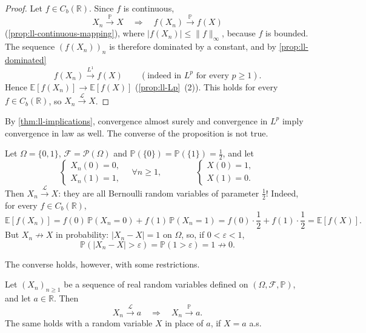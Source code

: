 \begin{proof}
Let $f\in C_b(\mathbb R)$. Since $f$ is continuous,
\[
  X_n\xrightarrow{\mathbb P}X\quad\Longrightarrow\quad f(X_n)\xrightarrow{\mathbb P}f(X)
\]
(\cref{prop:ll-continuous-mapping}), where $|f(X_n)|\le\|f\|_\infty$, because $f$ is bounded.
The sequence $(f(X_n))_n$ is therefore dominated by a constant, and by
\cref{prop:ll-dominated}
\[
  f(X_n)\xrightarrow{L^1}f(X)\qquad(\text{indeed in }L^p\text{ for every }p\ge1).
\]
Hence $\mathbb E[f(X_n)]\to\mathbb E[f(X)]$ (\cref{prop:ll-Lp}~(2)). This holds for every
$f\in C_b(\mathbb R)$, so $X_n\xrightarrow{\mathcal L}X$.
\end{proof}

By \cref{thm:ll-implications}, convergence almost surely and convergence in $L^p$ imply
convergence in law as well. The converse of the proposition is not true.

\begin{example}\label{exa:cl-bernoulli}
Let $\Omega=\{0,1\}$, $\mathcal F=\mathcal P(\Omega)$ and $\mathbb P(\{0\})=\mathbb P(\{1\})=\frac12$,
and let
\[
  \begin{cases}X_n(0)=0,\\ X_n(1)=1,\end{cases}\quad\forall n\ge1,\qquad\qquad
  \begin{cases}X(0)=1,\\ X(1)=0.\end{cases}
\]
Then $X_n\xrightarrow{\mathcal L}X$: they are all Bernoulli random variables of parameter
$\frac12$! Indeed, for every $f\in C_b(\mathbb R)$,
\[
  \mathbb E[f(X_n)]=f(0)\,\mathbb P(X_n=0)+f(1)\,\mathbb P(X_n=1)
  =f(0)\cdot\frac12+f(1)\cdot\frac12=\mathbb E[f(X)] .
\]
But $X_n\not\to X$ in probability: $|X_n-X|=1$ on $\Omega$, so, if $0<\varepsilon<1$,
\[
  \mathbb P(|X_n-X|>\varepsilon)=\mathbb P(1>\varepsilon)=1\not\to0 .
\]
\end{example}

The converse holds, however, with some restrictions.

\begin{proposition}\label{prop:cl-constant}
Let $(X_n)_{n\ge1}$ be a sequence of real random variables defined on
$(\Omega,\mathcal F,\mathbb P)$, and let $a\in\mathbb R$. Then
\[
  X_n\xrightarrow{\mathcal L}a\quad\Longrightarrow\quad X_n\xrightarrow{\mathbb P}a .
\]
The same holds with a random variable $X$ in place of $a$, if $X=a$ a.s.
\end{proposition}

